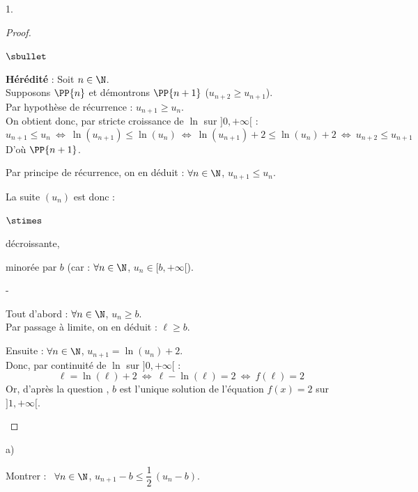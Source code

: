 \documentclass[11pt]{article}%
\begin{document}
\begin{noliste}{1.}
\begin{proof}
\begin{noliste}{$\sbullet$}
\begin{remark}
\begin{noliste}{\fitem}
	\item {\bf Hérédité} : Soit $n\in\N$.\\
	Supposons $\PP{n}$ et démontrons $\PP{n+1}$ (\ie $u_{n+2} 
	\geq u_{n+1}$).\\
	Par hypothèse de récurrence : $u_{n+1} \geq u_n$.\\
	On obtient donc, par stricte croissance de $\ln$ sur 
	$]0,+\infty[$ :
	\[
	  u_{n+1} \leq u_n \ \Leftrightarrow \ \ln(u_{n+1}) \leq 
	  \ln(u_n) 
	  \ \Leftrightarrow \ \ln(u_{n+1}) +2 \leq \ln(u_n)+2
	  \ \Leftrightarrow \ u_{n+2} \leq u_{n+1}
	\]
	D'où $\PP{n+1}$.
      \end{noliste}
      Par principe de récurrence, on en déduit : $\forall n \in \N$, 
      $u_{n+1} \leq u_n$.
      \end{remark}

      
      \item La suite $(u_n)$ est donc :
      \begin{noliste}{$\stimes$}
	\item décroissante,
	\item minorée par $b$ (car : $\forall n \in \N$, $u_n \in 
	[b,+\infty[$).
      \end{noliste}
      
      \item 
      \begin{noliste}{-}
	\item Tout d'abord : $\forall n\in \N$, $u_n \geq b$.\\
	Par passage à limite, on en déduit : $\ell \geq b$.
	
	\item Ensuite : $\forall n\in \N$, $u_{n+1} = \ln(u_n) +2$.\\
	Donc, par continuité de $\ln$ sur $]0,+\infty[$ :
	\[
	  \ell = \ln(\ell) +2 \ \Leftrightarrow \ \ell - \ln(\ell) =2
	  \ \Leftrightarrow \ f(\ell)=2
	\]
	Or, d'après la question , $b$ est l'unique solution 
	de l'équation $f(x)=2$ sur $]1,+\infty[$.
	~\\[-1.4cm]
      \end{noliste}
     \end{noliste}
    \end{proof}
  
  \item 
  \begin{noliste}{a)}
    \setlength{\itemsep}{2mm}
  \item Montrer : \ $\forall n \in \N$, $ u_{n+1}-b \leq \dfrac{1}{2}
    \, (u_n-b)$.
    

\end{noliste}
\end{noliste}
\end{document}

